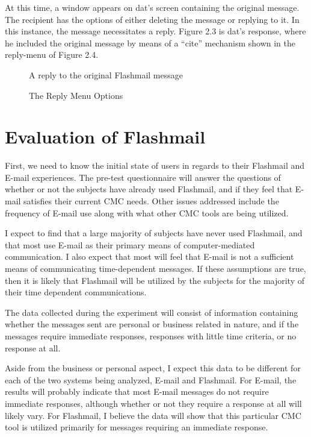 At this time, a window appears on dat's screen containing the original
message.  The recipient has the options of either deleting the message or
replying to it.  In this instance, the message necessitates a reply.
Figure 2.3 is dat's response, where he included the original message by
means of a ``cite'' mechanism shown in the reply-menu of Figure 2.4.

\begin{figure}[htb]
  {\centerline{}}
  \caption{A reply to the original Flashmail message}
  \label{Reply}
\end{figure}


\begin{figure}[htb]
  {\centerline{}}
  \caption{The Reply Menu Options}
  \label{Reply-menu}
\end{figure}


\chapter{Evaluation of Flashmail}
First, we need to know the initial state of users in regards to their
Flashmail and E-mail experiences.  The pre-test questionnaire will answer
the questions of whether or not the subjects have already used Flashmail,
and if they feel that E-mail satisfies their current CMC needs.  Other
issues addressed include the frequency of E-mail use along with what other
CMC tools are being utilized.

I expect to find that a large majority of subjects have never used
Flashmail, and that most use E-mail as their primary means of
computer-mediated communication. I  also expect that most will feel that
E-mail is not a sufficient means of communicating time-dependent messages.
If these assumptions are true, then it is likely that Flashmail will be
utilized by the subjects for the majority of their time dependent
communications.  

The data collected during the experiment will consist of information
containing whether the messages sent are personal or business related in
nature, and if the messages require immediate responses, responses with
little time criteria, or no response at all. 

Aside from the business or personal aspect, I expect this data to be
different for each of the two systems being analyzed, E-mail and
Flashmail. For E-mail, the results will probably indicate that most E-mail
messages do not require immediate responses, although whether or not they
require a response at all will likely vary. For Flashmail, I believe the
data will show that this particular CMC tool is utilized primarily for
messages requiring an immediate response.

